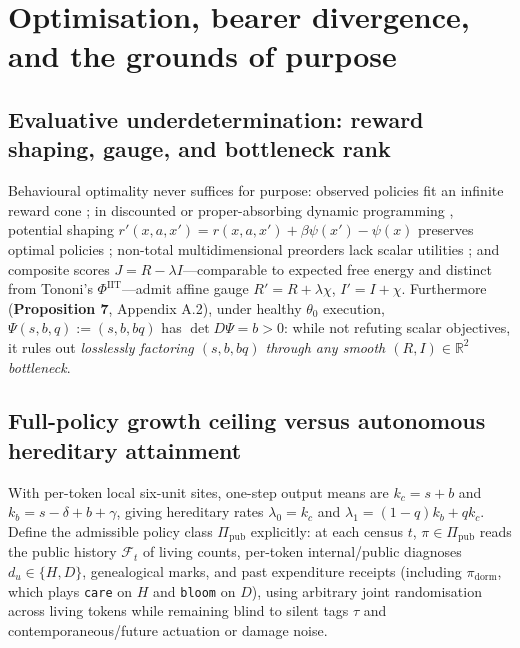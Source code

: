 \documentclass[12pt,letterpaper]{article}
\begin{document}
\section{Optimisation, bearer divergence, and the grounds of
purpose}\label{optimisation-bearer-divergence-and-the-grounds-of-purpose}

\subsection{Evaluative underdetermination: reward shaping, gauge, and
bottleneck
rank}\label{evaluative-underdetermination-reward-shaping-gauge-and-bottleneck-rank}

Behavioural optimality never suffices for purpose: observed policies fit
an infinite reward cone \citep[\S{}3.1]{ngRussell2000}; in discounted or
proper-absorbing dynamic programming
\citep{blackwell1965, puterman1994}, potential shaping
\(r'(x,a,x') = r(x,a,x') + \beta\psi(x') - \psi(x)\) preserves optimal
policies \citep{ngHaradaRussell1999}; non-total multidimensional
preorders lack scalar utilities \citep{krantz1971}; and composite scores
\(J = R - \lambda I\)---comparable to expected free energy
\citep{parrPezzuloFriston2022} and distinct from Tononi's
\citeyearpar{tononi2004} \(\Phi^{\mathrm{IIT}}\)---admit affine gauge
\(R' = R + \lambda\chi\), \(I' = I + \chi\). Furthermore
(\textbf{Proposition 7}, Appendix A.2), under healthy \(\theta_0\)
execution, \(\Psi(s,b,q) := (s, b, bq)\) has \(\det D\Psi = b > 0\):
while not refuting scalar objectives, it rules out \emph{losslessly
factoring \((s,b,bq)\) through any smooth \((R,I) \in \mathbb{R}^2\)
bottleneck}.

\subsection{Full-policy growth ceiling versus autonomous hereditary
attainment}\label{full-policy-growth-ceiling-versus-autonomous-hereditary-attainment}

With per-token local six-unit sites, one-step output means are
\(k_c = s+b\) and \(k_b = s-\delta+b+\gamma\), giving hereditary rates
\(\lambda_0 = k_c\) and \(\lambda_1 = (1-q)k_b + q k_c\). Define the
admissible policy class \(\Pi_{\mathrm{pub}}\) explicitly: at each
census \(t\), \(\pi \in \Pi_{\mathrm{pub}}\) reads the public history
\(\mathcal{F}_t\) of living counts, per-token internal/public diagnoses
\(d_u \in \{H, D\}\), genealogical marks, and past expenditure receipts
(including \(\pi_{\mathrm{dorm}}\), which plays \texttt{care} on \(H\)
and \texttt{bloom} on \(D\)), using arbitrary joint randomisation across
living tokens while remaining blind to silent tags \(\tau\) and
contemporaneous/future actuation or damage noise.
\end{document}
